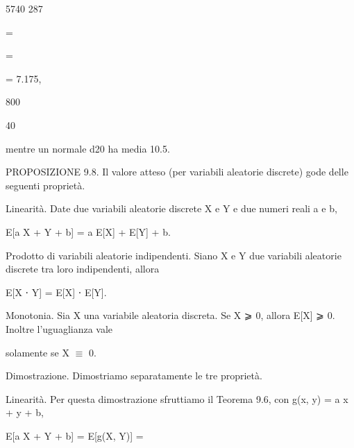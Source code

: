 \documentclass[a4paper,portrait,12pt]{article}
\begin{document}
5740 287


=


=


= 7.175,


800


40


\begin{flushleft}
mentre un normale d20 ha media 10.5.
\end{flushleft}


\begin{flushleft}
PROPOSIZIONE 9.8. Il valore atteso (per variabili aleatorie discrete) gode delle seguenti propriet\`{a}.
\end{flushleft}


\begin{flushleft}
Linearit\`{a}. Date due variabili aleatorie discrete X e Y e due numeri reali a e b,
\end{flushleft}


\begin{flushleft}
E[a X + Y + b] = a E[X] + E[Y] + b.
\end{flushleft}


\begin{flushleft}
Prodotto di variabili aleatorie indipendenti. Siano X e Y due variabili aleatorie discrete tra loro indipendenti, allora
\end{flushleft}


\begin{flushleft}
E[X ⋅ Y] = E[X] ⋅ E[Y].
\end{flushleft}


\begin{flushleft}
Monotonia. Sia X una variabile aleatoria discreta. Se X ⩾ 0, allora E[X] ⩾ 0. Inoltre l'uguaglianza vale
\end{flushleft}


\begin{flushleft}
solamente se X $\equiv$ 0.
\end{flushleft}


\begin{flushleft}
Dimostrazione. Dimostriamo separatamente le tre propriet\`{a}.
\end{flushleft}


\begin{flushleft}
Linearit\`{a}. Per questa dimostrazione sfruttiamo il Teorema 9.6, con g(x, y) = a x + y + b,
\end{flushleft}


\begin{flushleft}
E[a X + Y + b] = E[g(X, Y)] =
\end{flushleft}
\end{document}
